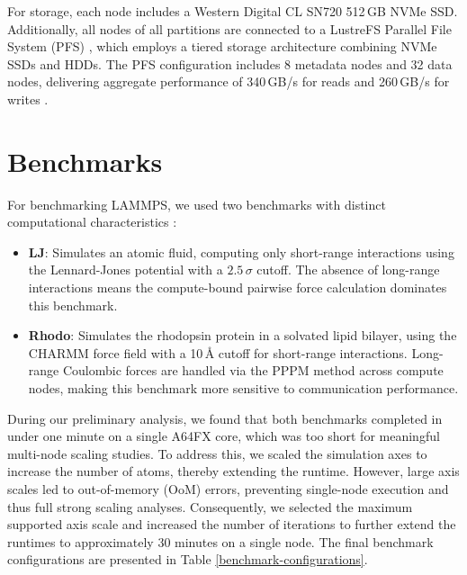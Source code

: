 \documentclass[sigplan, nonacm, screen]{acmart}
\begin{document}
For storage, each node includes a Western Digital CL SN720 512\,GB NVMe SSD. Additionally, all nodes
of all partitions are connected to a LustreFS Parallel File System (PFS) \cite{lustre}, which
employs a tiered storage architecture combining NVMe SSDs and HDDs. The PFS configuration includes 8
metadata nodes and 32 data nodes, delivering aggregate performance of 340\,GB/s for reads and
260\,GB/s for writes \cite{deucalion}.

\section{Benchmarks} %
\label{benchmarks}

For benchmarking LAMMPS, we used two benchmarks with distinct computational characteristics
\cite{lammps-benchmarks}:

\begin{itemize}
    \item \textbf{LJ}: Simulates an atomic fluid, computing only short-range interactions using the
                       Lennard-Jones potential with a $2.5\,\sigma$ cutoff. The absence of
                       long-range interactions means the compute-bound pairwise force calculation
                       dominates this benchmark.

    \item \textbf{Rhodo}: Simulates the rhodopsin protein in a solvated lipid bilayer, using the
                          CHARMM force field with a 10\,\r{A} cutoff for short-range interactions.
                          Long-range Coulombic forces are handled via the PPPM method across compute
                          nodes, making this benchmark more sensitive to communication performance.
\end{itemize}

During our preliminary analysis, we found that both benchmarks completed in under one minute on a
single A64FX core, which was too short for meaningful multi-node scaling studies. To address this,
we scaled the simulation axes to increase the number of atoms, thereby extending the runtime.
However, large axis scales led to out-of-memory (OoM) errors, preventing single-node execution and
thus full strong scaling analyses. Consequently, we selected the maximum supported axis scale and
increased the number of iterations to further extend the runtimes to approximately 30 minutes on a
single node. The final benchmark configurations are presented in Table
\ref{benchmark-configurations}.
\end{document}
